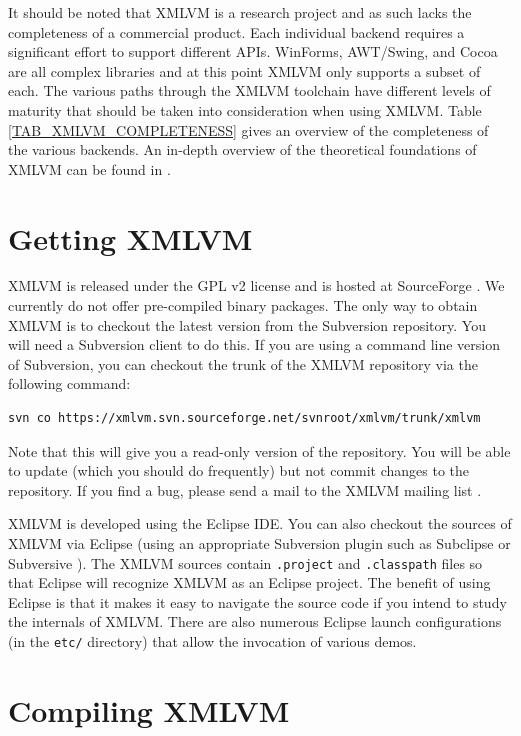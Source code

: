 \documentclass[11pt]{book}
\begin{document}
It should be noted that XMLVM is a research project and as such lacks
the completeness of a commercial product. Each individual backend
requires a significant effort to support different APIs. WinForms,
AWT/Swing, and Cocoa are all complex libraries and at this point XMLVM
only supports a subset of each. The various paths through the XMLVM
toolchain have different levels of maturity that should be taken
into consideration when using XMLVM. Table
\ref{TAB_XMLVM_COMPLETENESS} gives an overview of the completeness of
the various backends. An in-depth overview of the theoretical
foundations of XMLVM can be found in \cite{Puder:09a}.



\section{Getting XMLVM}
\label{SEC_GETTING_XMLVM}

XMLVM is released under the GPL v2 license and is hosted at
SourceForge \cite{sf-xmlvm}.
We currently do not offer pre-compiled binary packages.
The only way to obtain XMLVM is to checkout the latest version from
the Subversion repository. You will need a Subversion client to do
this. If you are using a command line version of Subversion, you can
checkout the trunk of the XMLVM repository via the following command:

\begin{verbatim}
svn co https://xmlvm.svn.sourceforge.net/svnroot/xmlvm/trunk/xmlvm
\end{verbatim}

Note that this will give you a read-only version of the repository.
You will be able to update (which you should do frequently) but not
commit changes to the repository. If you find a bug, please send a
mail to the XMLVM mailing list \cite{sf-xmlvm-list}.

XMLVM is developed using the Eclipse IDE. You can also checkout the
sources of XMLVM via Eclipse (using an appropriate Subversion plugin
such as Subclipse \cite{subclipse} or
Subversive \cite{subversive}). The XMLVM sources contain
\texttt{.project} and \texttt{.classpath} files so that Eclipse will
recognize XMLVM as an Eclipse project. The benefit of using Eclipse is
that it makes it easy to navigate the source code if you intend to
study the internals of XMLVM. There are also numerous Eclipse launch
configurations (in the \texttt{etc/} directory) that allow the
invocation of various demos.


\section{Compiling XMLVM}
\label{SEC_COMPILING_XMLVM}
\end{document}
